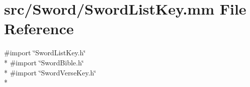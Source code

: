 \hypertarget{_sword_list_key_8mm}{\section{src/\-Sword/\-Sword\-List\-Key.mm File Reference}
\label{_sword_list_key_8mm}
}
{\ttfamily \#import \char`\"{}Sword\-List\-Key.\-h\char`\"{}}\\*
{\ttfamily \#import \char`\"{}Sword\-Bible.\-h\char`\"{}}\\*
{\ttfamily \#import \char`\"{}Sword\-Verse\-Key.\-h\char`\"{}}\\*
